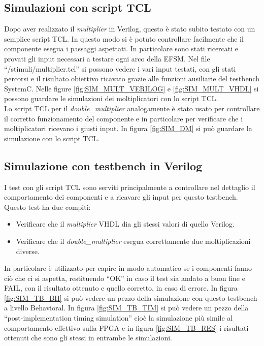 \documentclass[]{IEEEtran}
\begin{document}
\subsection{Simulazioni con script TCL}
Dopo aver realizzato il \textit{multiplier} in Verilog, questo è stato subito testato con un semplice script TCL. In questo modo si è potuto controllare facilmente che il componente esegua i passaggi aspettati. In particolare sono stati ricercati e provati gli input necessari a testare ogni arco della EFSM. Nel file ``/stimuli/multiplier.tcl'' si possono vedere i vari input testati, con gli stati percorsi e il risultato obiettivo ricavato grazie alle funzioni ausiliarie del testbench SystemC. Nelle figure \ref{fig:SIM_MULT_VERILOG} e \ref{fig:SIM_MULT_VHDL} si possono guardare le simulazioni dei moltiplicatori con lo script TCL.
\\Lo script TCL per il \textit{double\_multiplier} analogamente è stato usato per controllare il corretto funzionamento del componente e in particolare per verificare che i moltiplicatori ricevano i giusti input. In figura \ref{fig:SIM_DM} si può guardare la simulazione con lo script TCL.


\subsection{Simulazione con testbench in Verilog}
I test con gli script TCL sono serviti principalmente a controllare nel dettaglio il comportamento dei componenti e a ricavare gli input per questo testbench.
\\Questo test ha due compiti:
\begin{itemize}
    \item Verificare che il \textit{multiplier} VHDL dia gli stessi valori di quello Verilog.
    \item Verificare che il \textit{double\_multiplier} esegua correttamente due moltiplicazioni diverse.
\end{itemize}
In particolare è utilizzato per capire in modo automatico se i componenti fanno ciò che ci si aspetta, restituendo ``OK'' in caso il test sia andato a buon fine e FAIL, con il risultato ottenuto e quello corretto, in caso di errore.
In figura \ref{fig:SIM_TB_BH} si può vedere un pezzo della simulazione con questo testbench a livello Behavioral. In figura \ref{fig:SIM_TB_TIM} si può vedere un pezzo della ``post-implementation timing simulation'' cioè la simulazione più simile al comportamento effettivo sulla FPGA e in figura \ref{fig:SIM_TB_RES} i risultati ottenuti che sono gli stessi in entrambe le simulazioni.
\end{document}
